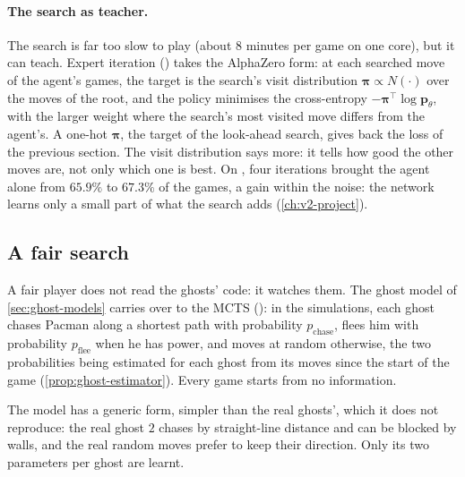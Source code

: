\paragraph{The search as teacher.} The search is far too slow to play
(about $8$ minutes per game on one core), but it can teach. Expert iteration
() takes the AlphaZero form: at each
searched move of the agent's games, the target is the search's visit
distribution $\boldsymbol{\pi} \propto N(\cdot)$ over the moves of the root,
and the policy minimises the cross-entropy $-\boldsymbol{\pi}^\top \log
\mathbf{p}_\theta$, with the larger weight where the search's most visited
move differs from the agent's. A one-hot $\boldsymbol{\pi}$, the target of
the look-ahead search, gives back the loss of the previous section. The
visit distribution says more: it tells how good the other moves are, not
only which one is best.
On , four iterations brought the agent alone from $65.9\%$ to
$67.3\%$ of the games, a gain within the noise: the network learns only a
small part of what the search adds (\cref{ch:v2-project}).

\subsection{A fair search}

A fair player does not read the ghosts' code: it watches them. The
 ghost model of \cref{sec:ghost-models} carries over to the
MCTS (): in the simulations, each ghost
chases Pacman along a shortest path with probability $p_{\mathrm{chase}}$,
flees him with probability $p_{\mathrm{flee}}$ when he has power, and moves
at random otherwise, the two probabilities being estimated for each ghost
from its moves since the start of the game (\cref{prop:ghost-estimator}).
Every game starts from no information.

The model has a generic form, simpler than the real ghosts', which it does
not reproduce: the real ghost $2$ chases by straight-line distance and can
be blocked by walls, and the real random moves prefer to keep their
direction. Only its two parameters per
ghost are learnt.

